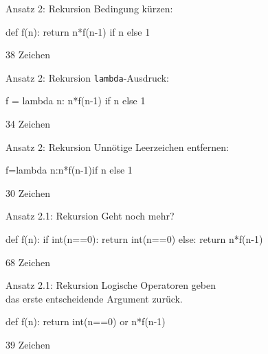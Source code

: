 \documentclass[xcolor=dvipsnames, aspectratio=43, 14pt]{beamer}
\begin{document}
\begin{frame}[fragile]{Ansatz 2: Rekursion}
	Bedingung kürzen:
	
	\vfill
	
	\begin{python3code}
	def f(n):
	   return n*f(n-1) if n else 1
	\end{python3code}
	\vfill
	
	38 Zeichen
\end{frame}

\begin{frame}[fragile]{Ansatz 2: Rekursion}
	\texttt{lambda}-Ausdruck:
	
	\vfill
	
	\begin{python3code}
	f = lambda n: n*f(n-1) if n else 1
	\end{python3code}
	\vfill
	
	34 Zeichen
\end{frame}

\begin{frame}[fragile]{Ansatz 2: Rekursion}
	Unnötige Leerzeichen entfernen:
	
	\vfill
	
	\begin{python3code}
	f=lambda n:n*f(n-1)if n else 1
	\end{python3code}
	\vfill
	
	30 Zeichen
\end{frame}

\begin{frame}[fragile]{Ansatz 2.1: Rekursion}
	Geht noch mehr?
	
	\vfill
	
	\begin{python3code}
	def f(n):
	   if int(n==0):
	      return int(n==0)
	   else:
	      return n*f(n-1)
	\end{python3code}
	
	\vfill
	
	68 Zeichen
\end{frame}

\begin{frame}[fragile]{Ansatz 2.1: Rekursion}
	Logische Operatoren geben\\ das erste entscheidende Argument zurück.
	
	\vfill
	
	\begin{python3code}
	def f(n):
	   return int(n==0) or n*f(n-1)
	\end{python3code}
	
	\vfill
	
	39 Zeichen
\end{frame}
\end{document}
